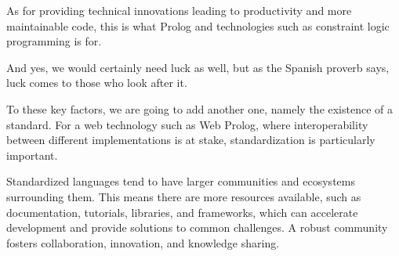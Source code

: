 As for providing technical innovations leading to productivity and more maintainable code, this is what Prolog and technologies such as constraint logic programming is for.

And yes, we would certainly need luck as well, but as the Spanish proverb says, luck comes to those who look after it. 

To these key factors, we are going to add another one, namely the existence of a standard. For a web technology such as Web Prolog, where interoperability between different implementations is at stake, standardization is particularly important. %

Standardized languages tend to have larger communities and ecosystems surrounding them. This means there are more resources available, such as documentation, tutorials, libraries, and frameworks, which can accelerate development and provide solutions to common challenges. A robust community fosters collaboration, innovation, and knowledge sharing.


